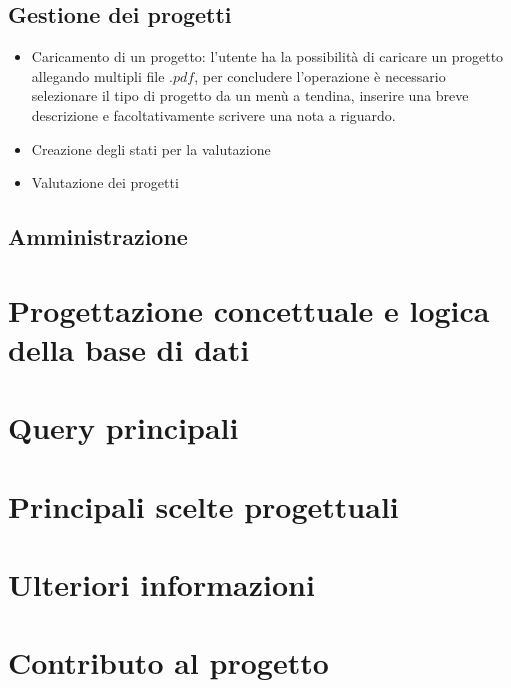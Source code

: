 \documentclass{article}
\begin{document}
\subsection{Gestione dei progetti}
\begin{itemize}
    \item Caricamento di un progetto: l'utente ha la possibilità di caricare un progetto allegando multipli file $.pdf$, per concludere l'operazione è necessario selezionare il tipo di progetto da un menù a tendina, inserire una breve descrizione e facoltativamente scrivere una nota a riguardo.
    \item Creazione degli stati per la valutazione
    \item Valutazione dei progetti
\end{itemize}

\subsection{Amministrazione}


\section{Progettazione concettuale e logica della base di dati}

\section{Query principali}

\section{Principali scelte progettuali}

\section{Ulteriori informazioni}

\section{Contributo al progetto}
\end{document}
